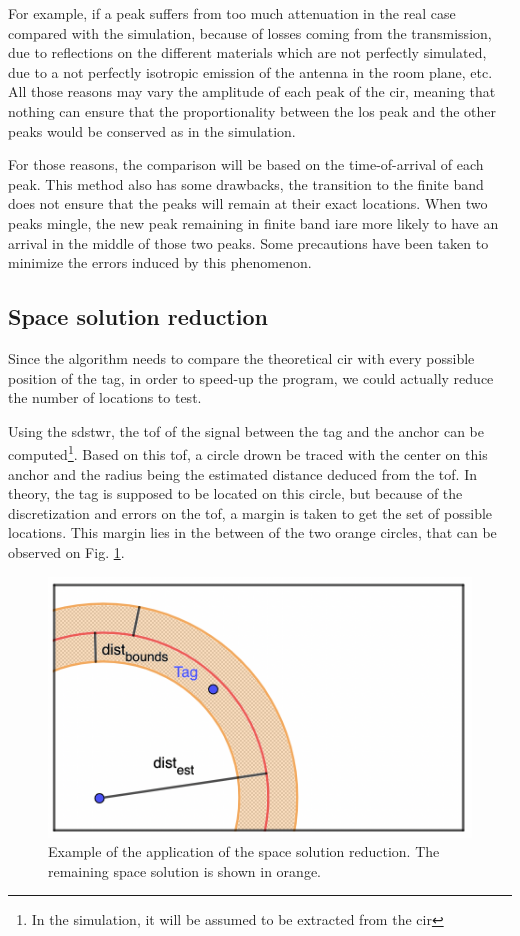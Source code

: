 For example, if a peak suffers from too much attenuation in the real case compared with the simulation, because of losses coming from the transmission, due to reflections on the different materials which are not perfectly simulated, due to a not perfectly isotropic emission of the antenna in the room plane, etc. All those reasons may vary the amplitude of each peak of the \gls{cir}, meaning that nothing can ensure that the proportionality between the \gls{los} peak and the other peaks would be conserved as in the simulation.
\vspace{2mm}

For those reasons, the comparison will be based on the time-of-arrival of each peak. This method also has some drawbacks, the transition to the finite band does not ensure that the peaks will remain at their exact locations. When two peaks mingle, the new peak remaining in finite band iare more likely to have an arrival in the middle of those two peaks. Some precautions have been taken to minimize the errors induced by this phenomenon.
\vspace{2mm}

\subsection{Space solution reduction}

Since the algorithm needs to compare the theoretical \gls{cir} with every possible position of the tag, in order to speed-up the program, we could actually reduce the number of locations to test.
\vspace{2mm}

Using the \gls{sdstwr}, the \gls{tof} of the signal between the tag and the anchor can be computed\footnote{In the simulation, it will be assumed to be extracted from the \gls{cir}}. Based on this \gls{tof}, a circle drown be traced with the center on this anchor and the radius being the estimated distance deduced from the \gls{tof}. In theory, the tag is supposed to be located on this circle, but because of the discretization and errors on the \gls{tof}, a margin is taken to get the set of possible locations. This margin lies in the between of the two orange circles, that can be observed on Fig. \ref{fig:speedup_1}.
\vspace{2mm}

\begin{figure}[H]
\centering
\includegraphics[width=.65\linewidth]{Images/algo_1.png}
\caption{Example of the application of the space solution reduction. The remaining space solution is shown in orange.}
\label{fig:speedup_1}
\end{figure}


